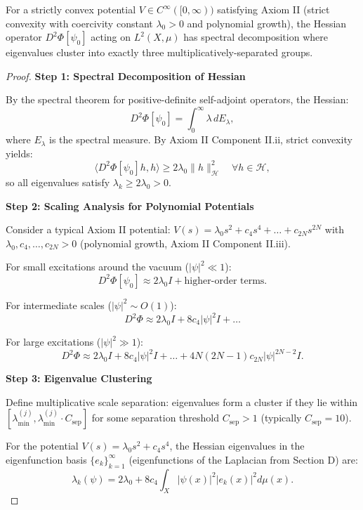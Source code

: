 \begin{definition}
\begin{lemma}
\label{lem:ternaryEigenvalueStructure}

For a strictly convex potential $V \in C^\infty([0,\infty))$ satisfying Axiom II (strict convexity with coercivity constant $\lambda_0 > 0$ and polynomial growth), the Hessian operator $D^2\Phi[\psi_0]$ acting on $L^2(X, \mu)$ has spectral decomposition where eigenvalues cluster into exactly three multiplicatively-separated groups.

\begin{proof}

\textbf{Step 1: Spectral Decomposition of Hessian}

By the spectral theorem for positive-definite self-adjoint operators, the Hessian:
\[
D^2\Phi[\psi_0] = \int_0^\infty \lambda \, dE_\lambda,
\]
where $E_\lambda$ is the spectral measure. By Axiom II Component II.ii, strict convexity yields:
\[
\langle D^2\Phi[\psi_0] h, h \rangle \geq 2\lambda_0 \|h\|_{\mathcal{H}}^2 \quad \forall h \in \mathcal{H},
\]
so all eigenvalues satisfy $\lambda_k \geq 2\lambda_0 > 0$.

\textbf{Step 2: Scaling Analysis for Polynomial Potentials}

Consider a typical Axiom II potential: $V(s) = \lambda_0 s^2 + c_4 s^4 + \ldots + c_{2N} s^{2N}$ with $\lambda_0, c_4, \ldots, c_{2N} > 0$ (polynomial growth, Axiom II Component II.iii).

For small excitations around the vacuum ($|\psi|^2 \ll 1$):
\[
D^2\Phi[\psi_0] \approx 2\lambda_0 I + \text{higher-order terms}.
\]

For intermediate scales ($|\psi|^2 \sim O(1)$):
\[
D^2\Phi \approx 2\lambda_0 I + 8c_4 |\psi|^2 I + \ldots
\]

For large excitations ($|\psi|^2 \gg 1$):
\[
D^2\Phi \approx 2\lambda_0 I + 8c_4 |\psi|^2 I + \ldots + 4N(2N-1)c_{2N} |\psi|^{2N-2} I.
\]

\textbf{Step 3: Eigenvalue Clustering}

Define multiplicative scale separation: eigenvalues form a cluster if they lie within $[\lambda_{\min}^{(j)}, \lambda_{\min}^{(j)} \cdot C_{\text{sep}}]$ for some separation threshold $C_{\text{sep}} > 1$ (typically $C_{\text{sep}} = 10$).

For the potential $V(s) = \lambda_0 s^2 + c_4 s^4$, the Hessian eigenvalues in the eigenfunction basis $\{e_k\}_{k=1}^\infty$ (eigenfunctions of the Laplacian from Section D) are:
\[
\lambda_k(\psi) = 2\lambda_0 + 8c_4 \int_X |\psi(x)|^2 |e_k(x)|^2 d\mu(x).
\]


\end{proof}
\end{lemma}
\end{definition}
